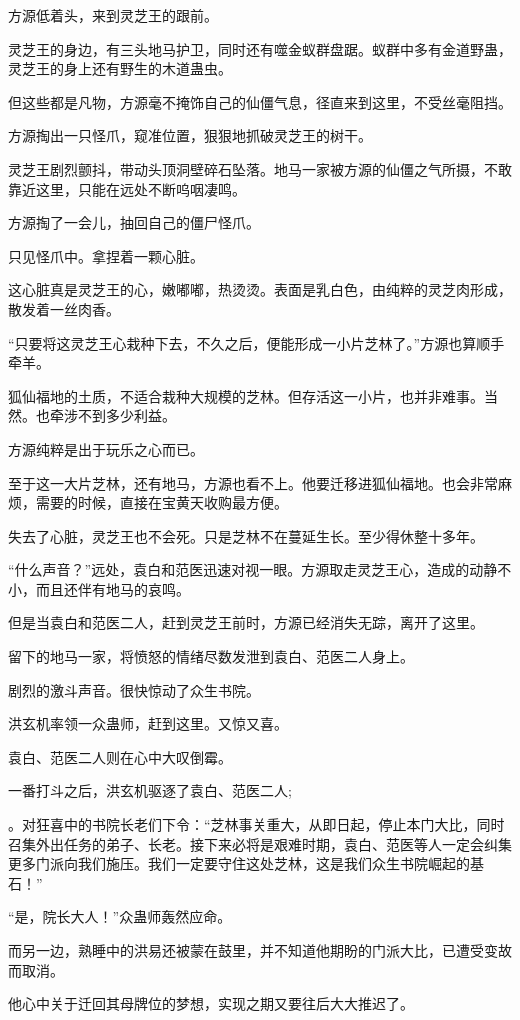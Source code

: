\begin{this_body}
方源低着头，来到灵芝王的跟前。

灵芝王的身边，有三头地马护卫，同时还有噬金蚁群盘踞。蚁群中多有金道野蛊，灵芝王的身上还有野生的木道蛊虫。

但这些都是凡物，方源毫不掩饰自己的仙僵气息，径直来到这里，不受丝毫阻挡。

方源掏出一只怪爪，窥准位置，狠狠地抓破灵芝王的树干。

灵芝王剧烈颤抖，带动头顶洞壁碎石坠落。地马一家被方源的仙僵之气所摄，不敢靠近这里，只能在远处不断呜咽凄鸣。

方源掏了一会儿，抽回自己的僵尸怪爪。

只见怪爪中。拿捏着一颗心脏。

这心脏真是灵芝王的心，嫩嘟嘟，热烫烫。表面是乳白色，由纯粹的灵芝肉形成，散发着一丝肉香。

“只要将这灵芝王心栽种下去，不久之后，便能形成一小片芝林了。”方源也算顺手牵羊。

狐仙福地的土质，不适合栽种大规模的芝林。但存活这一小片，也并非难事。当然。也牵涉不到多少利益。

方源纯粹是出于玩乐之心而已。

至于这一大片芝林，还有地马，方源也看不上。他要迁移进狐仙福地。也会非常麻烦，需要的时候，直接在宝黄天收购最方便。

失去了心脏，灵芝王也不会死。只是芝林不在蔓延生长。至少得休整十多年。

“什么声音？”远处，袁白和范医迅速对视一眼。方源取走灵芝王心，造成的动静不小，而且还伴有地马的哀鸣。

但是当袁白和范医二人，赶到灵芝王前时，方源已经消失无踪，离开了这里。

留下的地马一家，将愤怒的情绪尽数发泄到袁白、范医二人身上。

剧烈的激斗声音。很快惊动了众生书院。

洪玄机率领一众蛊师，赶到这里。又惊又喜。

袁白、范医二人则在心中大叹倒霉。

一番打斗之后，洪玄机驱逐了袁白、范医二人;

。对狂喜中的书院长老们下令：“芝林事关重大，从即日起，停止本门大比，同时召集外出任务的弟子、长老。接下来必将是艰难时期，袁白、范医等人一定会纠集更多门派向我们施压。我们一定要守住这处芝林，这是我们众生书院崛起的基石！”

“是，院长大人！”众蛊师轰然应命。

而另一边，熟睡中的洪易还被蒙在鼓里，并不知道他期盼的门派大比，已遭受变故而取消。

他心中关于迁回其母牌位的梦想，实现之期又要往后大大推迟了。


\end{this_body}
